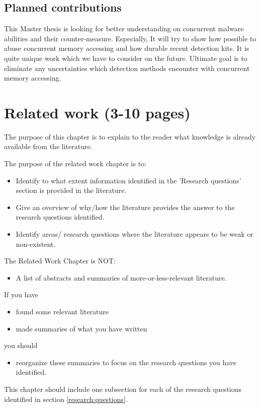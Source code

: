 \documentclass[informationsecurity]{gucmasterproject}
\begin{document}
\section{Planned contributions}
This Master thesis is looking for better understanding on concurrent malware abilities and their counter-measure. Especially, It will try to show how possible to abuse concurrent memory accessing and how durable recent detection kits. It is quite unique work which we have to consider on the future. Ultimate goal is to eliminate any uncertainties which detection methods encounter with concurrent memory accessing.

\chapter{Related work (3-10 pages)}
The purpose of this chapter
is to explain to the reader what knowledge is already
available from the literature.

The purpose of the related work chapter is to:
\begin{itemize}
\item Identify to what extent information identified in the 'Research questions'  section is provided in the literature.
\item Give an overview of why/how the literature provides the answer to the research questions identified.
\item Identify areas/ research questions where the literature appears to be weak or non-existent.
\end{itemize}
The Related Work Chapter is NOT:
\begin{itemize}
\item   A list of abstracts and summaries of more-or-less-relevant literature.
\end{itemize}
If you have
\begin{itemize}
\item   found some relevant literature
\item   made summaries of what you have written
\end{itemize}
you should
\begin{itemize}
\item reorganize these summaries to focus on the research questions you have identified.
\end{itemize}

This chapter should include one subsection for each of the research
questions identified in section \ref{research:questions}.  
\end{document}
